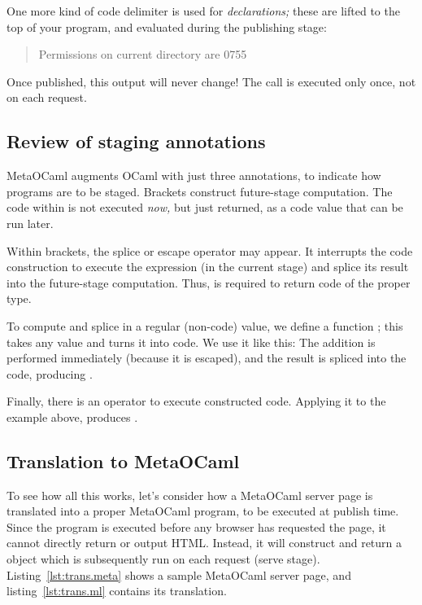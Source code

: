 \documentclass[preprint]{acm_proc_article-sp}
\def\MOC{MetaOCaml\xspace}
\newcounter{listing}
\begin{document}
One more kind of code delimiter is used for \emph{declarations;}
these are lifted to the top of your program, and evaluated during
the publishing stage:
\begin{quote}
Permissions on current directory are 0755
\end{quote}

Once published, this output will never change!  The 
call is executed only once, not on each request.

\subsection{Review of staging annotations}

\MOC augments OCaml with just three annotations, to indicate how
programs are to be staged.  Brackets  construct future-stage computation.  The code within
is not executed \emph{now,} but just returned, as a code value that can be
run later.  

Within brackets, the splice or escape operator  may
appear.  It interrupts the code construction to execute the expression
 (in the current stage) and splice its result into the
future-stage computation.  Thus,  is required to return code of
the proper type.

To compute and splice in a regular (non-code) value, we define a
function ; this
takes any value and turns it into code.  We use it like this:
 The addition is
performed immediately (because it is escaped), and the result is
spliced into the code, producing .

Finally, there is an operator \Mrun{} to execute constructed code.
Applying it to the example above,  produces .


\subsection{Translation to \MOC}
To see how all this works, let's consider how a \MOC server
page is translated into a proper \MOC program, to be executed
at publish time.  Since the program is executed before any
browser has requested the page, it cannot directly return or
output HTML.  Instead, it will construct and return a 
object which is subsequently run on each request (serve stage).
Listing~\ref{lst:trans.meta} shows a sample \MOC server page,
and listing~\ref{lst:trans.ml} contains its translation.
\end{document}
